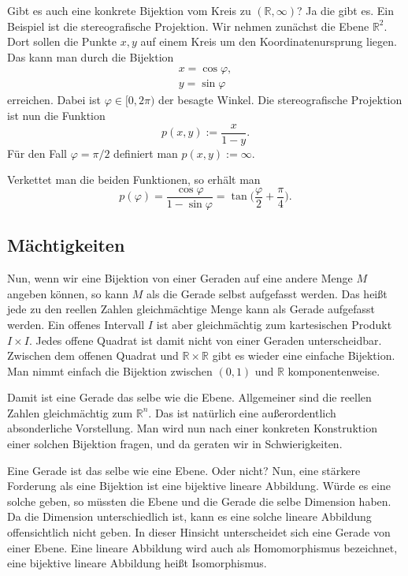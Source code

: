 \documentclass[a4paper,11pt,fleqn,twocolumn,twoside,dvipdfmx]{scrartcl}
\newcommand{\R}{\mathbb R}
\begin{document}
Gibt es auch eine konkrete Bijektion vom Kreis zu
$(\R,\infty)$? Ja die gibt es. Ein Beispiel ist die
stereografische Projektion. Wir nehmen zunächst die Ebene
$\R^2$. Dort sollen die Punkte $x,y$ auf einem Kreis
um den Koordinatenursprung liegen. Das kann man durch die Bijektion
\begin{gather}
x=\cos\varphi,\\
y=\sin\varphi
\end{gather}
erreichen. Dabei ist $\varphi\in{[0,2\pi)}$ der besagte Winkel.
Die stereografische Projektion ist nun die Funktion
\begin{equation}
p(x,y) := \frac{x}{1-y}.
\end{equation}
Für den Fall $\varphi=\pi/2$ definiert man $p(x,y):=\infty$.

Verkettet man die beiden Funktionen, so erhält man
\begin{equation}
p(\varphi) = \frac{\cos\varphi}{1-\sin\varphi}
= \tan\Big(\frac{\varphi}{2}+\frac{\pi}{4}\Big).
\end{equation}

\subsection{Mächtigkeiten}

Nun, wenn wir eine Bijektion von einer Geraden auf eine andere Menge
$M$ angeben können, so kann $M$ als die Gerade selbst aufgefasst
werden. Das heißt jede zu den reellen Zahlen gleichmächtige Menge
kann als Gerade aufgefasst werden. Ein offenes Intervall $I$ ist
aber gleichmächtig zum kartesischen Produkt $I\times I$. Jedes
offene Quadrat ist damit nicht von einer Geraden unterscheidbar.
Zwischen dem offenen Quadrat und $\R\times\R$ gibt
es wieder eine einfache Bijektion. Man nimmt einfach die Bijektion
zwischen $(0,1)$ und $\R$ komponentenweise.

Damit ist eine Gerade das selbe wie die Ebene. Allgemeiner sind die
reellen Zahlen gleichmächtig zum $\R^n$. Das ist natürlich
eine außerordentlich absonderliche Vorstellung. Man wird nun nach
einer konkreten Konstruktion einer solchen Bijektion fragen, und
da geraten wir in Schwierigkeiten.

Eine Gerade ist das selbe wie eine Ebene. Oder nicht?
Nun, eine stärkere Forderung als eine Bijektion ist eine
bijektive lineare Abbildung. Würde es eine solche geben, so müssten
die Ebene und die Gerade die selbe Dimension haben. Da die Dimension
unterschiedlich ist, kann es eine solche lineare Abbildung
offensichtlich nicht geben. In dieser Hinsicht unterscheidet sich
eine Gerade von einer Ebene. Eine lineare Abbildung wird auch als
Homomorphismus bezeichnet, eine bijektive lineare Abbildung heißt
Isomorphismus.
\end{document}
